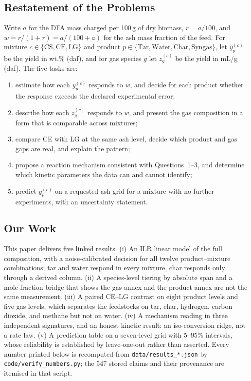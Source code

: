 \documentclass[withoutpreface,bwprint]{apmcmthesis}
\begin{document}
\subsection{Restatement of the Problems}
Write $a$ for the DFA mass charged per 100\,g of dry biomass, $r=a/100$, and $w=r/(1+r)=a/(100+a)$ for the ash mass fraction of the feed. For mixture $c\in\{\mathrm{CS},\mathrm{CE},\mathrm{LG}\}$ and product $p\in\{\mathrm{Tar},\mathrm{Water},\mathrm{Char},\mathrm{Syngas}\}$, let $y_p^{(c)}$ be the yield in wt.\% (daf), and for gas species $g$ let $z_g^{(c)}$ be the yield in mL/g (daf). The five tasks are:
\begin{enumerate}
\item estimate how each $y_p^{(c)}$ responds to $w$, and decide for each product whether the response exceeds the declared experimental error;
\item describe how each $z_g^{(c)}$ responds to $w$, and present the gas composition in a form that is comparable across mixtures;
\item compare CE with LG at the same ash level, decide which product and gas gaps are real, and explain the pattern;
\item propose a reaction mechanism consistent with Questions~1--3, and determine which kinetic parameters the data can and cannot identify;
\item predict $y_p^{(c)}$ on a requested ash grid for a mixture with no further experiments, with an uncertainty statement.
\end{enumerate}

\subsection{Our Work}
This paper delivers five linked results. (i) An ILR linear model of the full composition, with a noise-calibrated decision for all twelve product--mixture combinations; tar and water respond in every mixture, char responds only through a derived column. (ii) A species-level tiering by absolute span and a mole-fraction bridge that shows the gas annex and the product annex are not the same measurement. (iii) A paired CE--LG contrast on eight product levels and five gas levels, which separates the feedstocks on tar, char, hydrogen, carbon dioxide, and methane but not on water. (iv) A mechanism reading in three independent signatures, and an honest kinetic result: an iso-conversion ridge, not a rate law. (v) A prediction table on a seven-level grid with 5--95\% intervals, whose reliability is established by leave-one-out rather than asserted. Every number printed below is recomputed from \texttt{data/results\_*.json} by \texttt{code/verify\_numbers.py}; the 547 stored claims and their provenance are itemised in that script.
\end{document}
